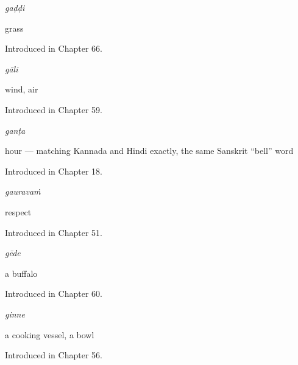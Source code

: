 \noindent\begin{minipage}[t]{\linewidth}
\raggedright
\textbf{}\enspace\emph{gaḍḍi}\par
\small grass\par
\footnotesize Introduced in Chapter 66.
\end{minipage}\par\medskip

\noindent\begin{minipage}[t]{\linewidth}
\raggedright
\textbf{}\enspace\emph{gāli}\par
\small wind, air\par
\footnotesize Introduced in Chapter 59.
\end{minipage}\par\medskip

\noindent\begin{minipage}[t]{\linewidth}
\raggedright
\textbf{}\enspace\emph{ganṭa}\par
\small hour — matching Kannada and Hindi exactly, the same Sanskrit \textquotedblleft{}bell\textquotedblright{} word\par
\footnotesize Introduced in Chapter 18.
\end{minipage}\par\medskip

\noindent\begin{minipage}[t]{\linewidth}
\raggedright
\textbf{}\enspace\emph{gauravaṁ}\par
\small respect\par
\footnotesize Introduced in Chapter 51.
\end{minipage}\par\medskip

\noindent\begin{minipage}[t]{\linewidth}
\raggedright
\textbf{}\enspace\emph{gēde}\par
\small a buffalo\par
\footnotesize Introduced in Chapter 60.
\end{minipage}\par\medskip

\noindent\begin{minipage}[t]{\linewidth}
\raggedright
\textbf{}\enspace\emph{ginne}\par
\small a cooking vessel, a bowl\par
\footnotesize Introduced in Chapter 56.
\end{minipage}\par\medskip

